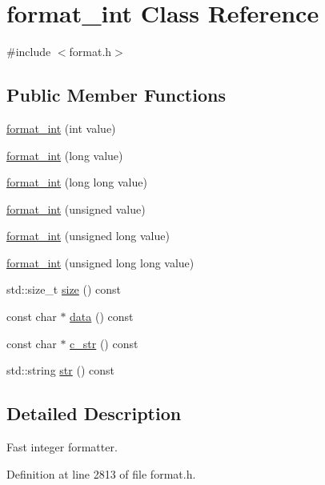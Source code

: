 \hypertarget{classformat__int}{}\section{format\+\_\+int Class Reference}
\label{classformat__int}


{\ttfamily \#include $<$format.\+h$>$}

\subsection*{Public Member Functions}
\begin{DoxyCompactItemize}
\item 
\hyperlink{classformat__int_a3664fa2bb28b1636eb2ceb8f2a28c5d3}{format\+\_\+int} (int value)
\item 
\hyperlink{classformat__int_a473c02889ad9139f7b6c008de5be9224}{format\+\_\+int} (long value)
\item 
\hyperlink{classformat__int_a72e64eccbef3c56539074d790c4f5811}{format\+\_\+int} (long long value)
\item 
\hyperlink{classformat__int_ad474137ee4a9d0545f0c8a2b3f6f6cf8}{format\+\_\+int} (unsigned value)
\item 
\hyperlink{classformat__int_affccebfca726a18d469e726655401d35}{format\+\_\+int} (unsigned long value)
\item 
\hyperlink{classformat__int_a04c207f578ee7611d897c77ab4a34ff0}{format\+\_\+int} (unsigned long long value)
\item 
std\+::size\+\_\+t \hyperlink{classformat__int_a644fe6f2d0505d48ff08ab22448b5069}{size} () const
\item 
const char $\ast$ \hyperlink{classformat__int_a4ecc95eeed01911d1e2dcc4fabc5df5a}{data} () const
\item 
const char $\ast$ \hyperlink{classformat__int_a0ae1671f3ddacb00738133f29549b724}{c\+\_\+str} () const
\item 
std\+::string \hyperlink{classformat__int_ab14204962423d35a320f15e673b08e06}{str} () const
\end{DoxyCompactItemize}


\subsection{Detailed Description}
Fast integer formatter. 

Definition at line 2813 of file format.\+h.



